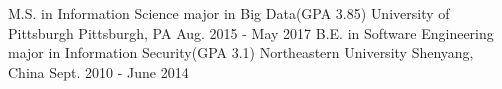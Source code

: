 
\begin{cventries}

  \edu
    {M.S. in Information Science major in Big Data(GPA 3.85)}
    {University of Pittsburgh}
    {Pittsburgh, PA}
    {Aug. 2015 - May 2017}
  \edu
    {B.E. in Software Engineering major in Information Security(GPA 3.1)}  %
    {Northeastern University}  %
    {Shenyang, China}  %
    {Sept. 2010 - June 2014}  %
\end{cventries}
